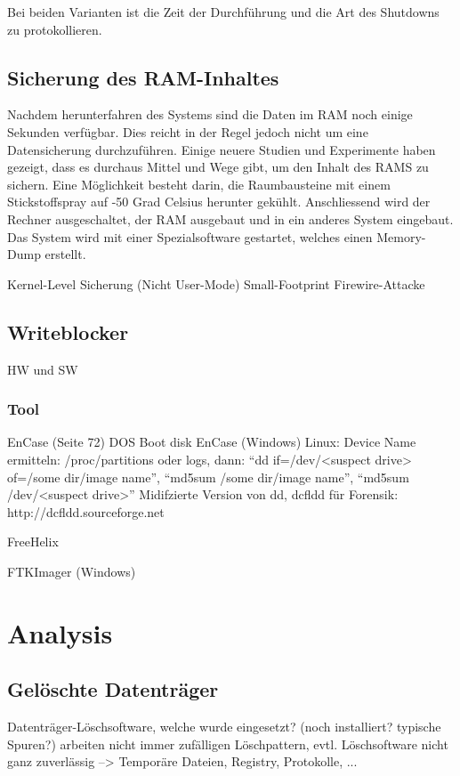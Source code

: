 Bei beiden Varianten ist die Zeit der Durchführung und die Art des Shutdowns zu protokollieren.

\subsection{Sicherung des RAM-Inhaltes}
Nachdem herunterfahren des Systems sind die Daten im RAM noch einige Sekunden verfügbar. Dies reicht in der Regel jedoch nicht um eine Datensicherung durchzuführen. Einige neuere Studien und Experimente haben gezeigt, dass es durchaus Mittel und Wege gibt, um den Inhalt des RAMS zu sichern. Eine Möglichkeit besteht darin, die Raumbausteine mit einem Stickstoffspray auf -50 Grad Celsius herunter gekühlt. Anschliessend wird der Rechner ausgeschaltet, der RAM ausgebaut und in ein anderes System eingebaut. Das System wird mit einer Spezialsoftware gestartet, welches einen Memory-Dump erstellt.

Kernel-Level Sicherung (Nicht User-Mode)
Small-Footprint
Firewire-Attacke
\subsection{Writeblocker}
HW und SW

\subsubsection{Tool}
EnCase (Seite 72) DOS Boot disk
EnCase (Windows)
Linux: Device Name ermitteln: /proc/partitions oder logs, dann: "`dd if=/dev/<suspect drive> of=/some dir/image name"', "`md5sum /some dir/image name"', "`md5sum /dev/<suspect drive>"'
Midifzierte Version von dd, dcfldd für Forensik: http://dcfldd.sourceforge.net

FreeHelix

FTKImager (Windows)




\section{Analysis}

\subsection{Gelöschte Datenträger}
Datenträger-Löschsoftware, welche wurde eingesetzt? (noch installiert? typische Spuren?) arbeiten nicht immer zufälligen Löschpattern, evtl. Löschsoftware nicht ganz zuverlässig --> Temporäre Dateien, Registry, Protokolle, ...

